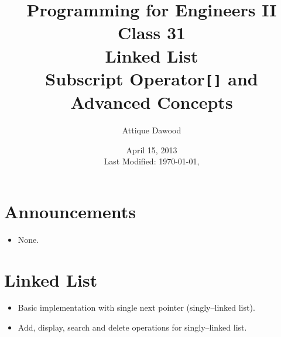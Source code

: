 \documentclass[12pt,a4paper]{article}
\title{\vspace{-2cm}Programming for Engineers II\\Class 31\\Linked List\\Subscript Operator\texttt{[]} and Advanced Concepts}
\author{Attique Dawood}
\date{April 15, 2013\\[0.2cm] Last Modified: \today, \currenttime}
\begin{document}
\maketitle
\section{Announcements}
\begin{itemize}
\item None.
\end{itemize}
\section{Linked List}
\begin{itemize}
\item Basic implementation with single next pointer (singly--linked list).
\item Add, display, search and delete operations for singly--linked list.
\end{itemize}
\end{document}
